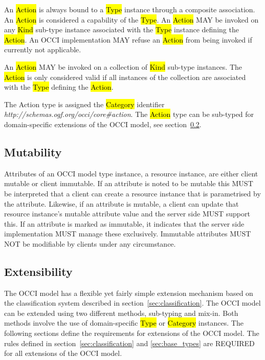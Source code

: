 \documentclass[10pt,a4paper,british]{article}
\begin{document}

An \hl{Action} is always bound to a \hl{Type} instance through a composite
association. An \hl{Action} is considered a capability of the \hl{Type}.  An
\hl{Action} MAY be invoked on any \hl{Kind} sub-type instance associated with
the \hl{Type} instance defining the \hl{Action}. An OCCI implementation MAY
refuse an \hl{Action} from being invoked if currently not applicable.

An \hl{Action} MAY be invoked on a collection of \hl{Kind} sub-type instances.
The \hl{Action} is only considered valid if all instances of the collection are
associated with the \hl{Type} defining the \hl{Action}.

The Action type is assigned the \hl{Category} identifier
\textit{http://schemas.ogf.org/occi/core\#action}.
%
The \hl{Action} type can be sub-typed for domain-specific extensions of the
OCCI model, see section~\ref{sec:extensibility}.

\subsection{Mutability}
Attributes of an OCCI model type instance, a resource instance, are
either client mutable or client immutable. If an attribute is noted to
be mutable this MUST be interpreted that a client can create a
resource instance that is parametrised by the attribute. Likewise, if
an attribute is mutable, a client can update that resource instance's
mutable attribute value and the server side MUST support this. If an
attribute is marked as immutable, it indicates that the server side
implementation MUST manage these exclusively. Immutable attributes
MUST NOT be modifiable by clients under any circumstance.

\subsection{Extensibility}
\label{sec:extensibility}
The OCCI model has a flexible yet fairly simple extension mechanism based on
the classification system described in section~\ref{sec:classification}.
%
The OCCI model can be extended using two different methods, sub-typing and
mix-in. Both methods involve the use of domain-specific \hl{Type} or
\hl{Category} instances. The following sections define the requirements for
extensions of the OCCI model.
%
The rules defined in section~\ref{sec:classification} and \ref{sec:base_types}
are REQUIRED for all extensions of the OCCI model.
\end{document}
